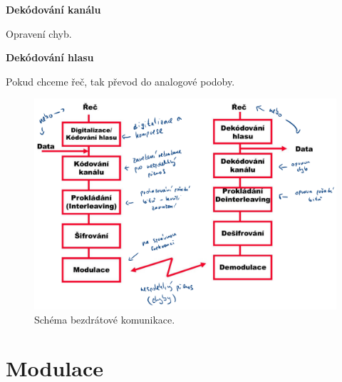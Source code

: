 \begin{compactenum}
    \item \textbf{Dekódování kanálu} \begin{compactitem}
        \item Opravení chyb.
    \end{compactitem}

    \item \textbf{Dekódování hlasu} \begin{compactitem}
        \item Pokud chceme řeč, tak převod do analogové podoby.
    \end{compactitem}
\end{compactenum}

\begin{figure}[H]
    \centering
    \includegraphics[width=1\linewidth]{bezdratova_komunikace.pdf}
    \caption{Schéma bezdrátové komunikace.}
\end{figure}


\section{Modulace}

